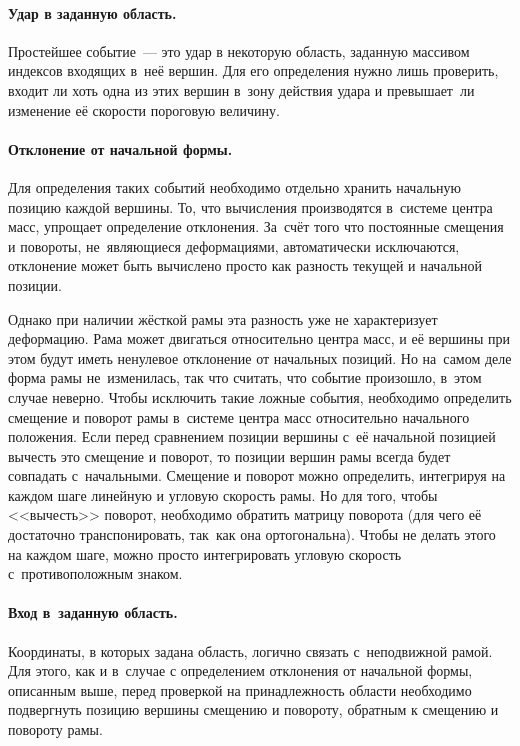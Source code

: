 \documentclass[a4paper, 14pt, titlepage]{extarticle}
\begin{document}
        \paragraph{Удар в заданную область.}
        Простейшее событие~--- это удар в некоторую область, заданную массивом индексов
        входящих в~неё вершин. Для его определения нужно лишь проверить, входит ли хоть одна из этих
        вершин в~зону действия удара и превышает~ли изменение её скорости пороговую величину.

        \paragraph{Отклонение от начальной формы.}
        Для определения таких событий необходимо отдельно хранить начальную позицию каждой вершины.
        То, что вычисления производятся в~системе центра масс, упрощает определение
        отклонения. За~счёт того что постоянные смещения и повороты, не~являющиеся деформациями,
        автоматически исключаются, отклонение может быть вычислено просто как разность текущей и
        начальной позиции.

        Однако при наличии жёсткой рамы эта разность уже не характеризует деформацию. Рама может
        двигаться относительно центра масс, и её вершины при этом будут иметь ненулевое отклонение
        от начальных позиций. Но на~самом деле форма рамы не~изменилась, так что считать, что событие
        произошло, в~этом случае неверно. Чтобы исключить такие ложные события, необходимо определить смещение и поворот
        рамы в~системе центра масс относительно начального положения. Если перед сравнением позиции
        вершины с~её начальной позицией вычесть это смещение и поворот, то позиции вершин рамы
        всегда будет совпадать с~начальными. Смещение и поворот можно определить, интегрируя на
        каждом шаге линейную и угловую скорость рамы. Но для того, чтобы <<вычесть>> поворот,
        необходимо обратить матрицу поворота (для чего её достаточно транспонировать, так~как она
        ортогональна). Чтобы не делать этого на каждом шаге, можно просто интегрировать угловую
        скорость с~противоположным знаком.

        \paragraph{Вход в~заданную область.}
        Координаты, в которых задана область, логично связать с~неподвижной рамой. Для этого, как и
        в~случае с определением отклонения от начальной формы, описанным выше, перед проверкой на принадлежность
        области необходимо подвергнуть позицию вершины смещению и повороту, обратным к смещению и
        повороту рамы.
\end{document}
